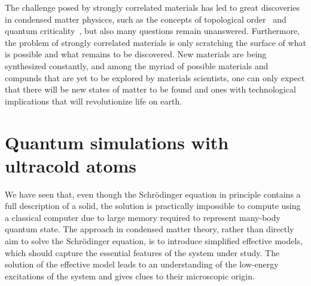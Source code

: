 \documentclass[oneside,11pt]{memoir}
\begin{document}
The challenge posed by strongly correlated materials has led to great
discoveries in condensed matter physiccs, such as the concepts of topological
order~\cite{wen1990topological} and quantum
criticality~\cite{PhysRevB.14.1165,sachdev2011quantum}, but also many questions
remain unanswered.  Furthermore, the problem of strongly correlated materials
is only scratching the surface of what is possible and what remains to be
discovered.  New materials are being synthesized constantly, and among the
myriad of possible materials and compunds that are yet to be explored by
materials scientists, one can only expect that there will be new states of
matter to be found and ones with technological implications that will
revolutionize life on earth.  


\section{Quantum simulations with ultracold atoms}

We have seen that, even though the Schr\"{o}dinger equation in principle
contains a full description of a solid,  the solution is practically impossible
to compute using a classical computer due to large memory required to represent
many-body quantum state.   
The approach in condensed matter theory, rather than directly aim to solve the
Schr\"{o}dinger equation, is to introduce simplified effective models, which
should capture the essential features of the system under study.  The solution
of the effective model leads to an understanding of the low-energy excitations
of the system and gives clues to their microscopic origin.   
\end{document}
